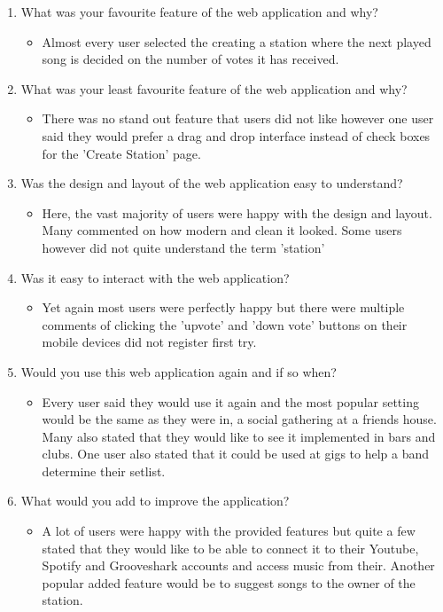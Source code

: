 \documentclass[a4paper, 12pt]{report}
\begin{document}
\begin{enumerate}
\item What was your favourite feature of the web application and why?
\begin{itemize}
\item Almost every user selected the creating a station where the next played song is decided on the number of votes it has received.
\end{itemize}
\item What was your least favourite feature of the web application and why?
\begin{itemize}
\item There was no stand out feature that users did not like however one user said they would prefer a drag and drop interface instead of check boxes for the 'Create Station' page.
\end{itemize}
\item Was the design and layout of the web application easy to understand?
\begin{itemize}
\item Here, the vast majority of users were happy with the design and layout. Many commented on how modern and clean it looked. Some users however did not quite understand the term 'station'
\end{itemize}
\item Was it easy to interact with the web application?
\begin{itemize}
\item Yet again most users were perfectly happy but there were multiple comments of clicking the 'upvote' and 'down vote' buttons on their mobile devices did not register first try.
\end{itemize}
\item Would you use this web application again and if so when?
\begin{itemize}
\item Every user said they would use it again and the most popular setting would be the same as they were in, a social gathering at a friends house. Many also stated that they would like to see it implemented in bars and clubs. One user also stated that it could be used at gigs to help a band determine their setlist.
\end{itemize}
\item What would you add to improve the application?
\begin{itemize}
\item A lot of users were happy with the provided features but quite a few stated that they would like to be able to connect it to their Youtube, Spotify and Grooveshark accounts and access music from their. Another popular added feature would be to suggest songs to the owner of the station.
\end{itemize}
\end{enumerate}
\end{document}
